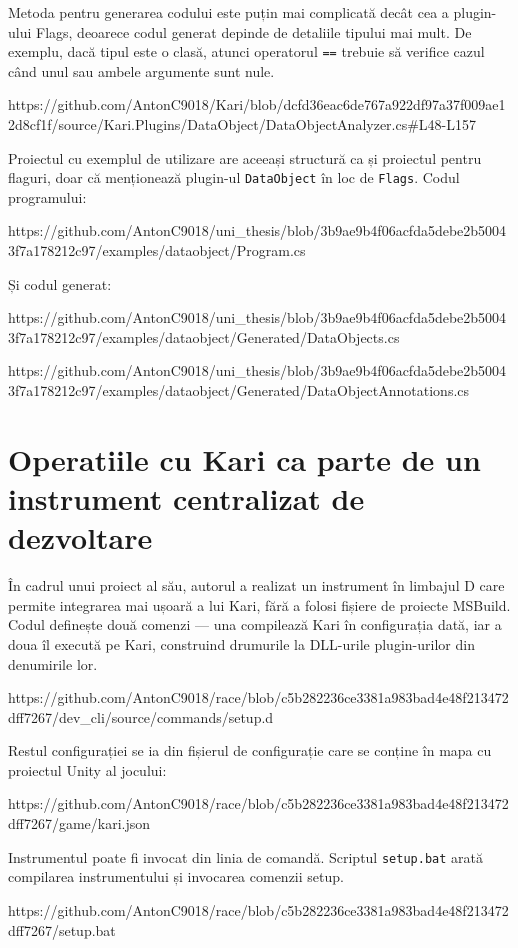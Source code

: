 \documentclass{report}
\begin{document}
Metoda pentru generarea codului este puțin mai complicată decât cea a plugin-ului Flags, deoarece codul generat depinde de detaliile tipului mai mult.
De exemplu, dacă tipul este o clasă, atunci operatorul \texttt{==} trebuie să verifice cazul când unul sau ambele argumente sunt nule. 

https://github.com/AntonC9018/Kari/blob/dcfd36eac6de767a922df97a37f009ae12d8cf1f/source/Kari.Plugins/DataObject/DataObjectAnalyzer.cs#L48-L157

Proiectul cu exemplul de utilizare are aceeași structură ca și proiectul pentru flaguri, doar că menționează plugin-ul \texttt{DataObject} în loc de \texttt{Flags}.
Codul programului:

https://github.com/AntonC9018/uni_thesis/blob/3b9ae9b4f06acfda5debe2b50043f7a178212c97/examples/dataobject/Program.cs

Și codul generat:

https://github.com/AntonC9018/uni_thesis/blob/3b9ae9b4f06acfda5debe2b50043f7a178212c97/examples/dataobject/Generated/DataObjects.cs

https://github.com/AntonC9018/uni_thesis/blob/3b9ae9b4f06acfda5debe2b50043f7a178212c97/examples/dataobject/Generated/DataObjectAnnotations.cs

\section{Operatiile cu Kari ca parte de un instrument centralizat de dezvoltare}

În cadrul unui proiect al său, autorul a realizat un instrument în limbajul D care permite integrarea mai ușoară a lui Kari, fără a folosi fișiere de proiecte MSBuild.
Codul definește două comenzi — una compilează Kari în configurația dată, iar a doua îl execută pe Kari, construind drumurile la DLL-urile plugin-urilor din denumirile lor.

https://github.com/AntonC9018/race/blob/c5b282236ce3381a983bad4e48f213472dff7267/dev_cli/source/commands/setup.d

Restul configurației se ia din fișierul de configurație care se conține în mapa cu proiectul Unity al jocului:

https://github.com/AntonC9018/race/blob/c5b282236ce3381a983bad4e48f213472dff7267/game/kari.json

Instrumentul poate fi invocat din linia de comandă.
Scriptul \texttt{setup.bat} arată compilarea instrumentului și invocarea comenzii setup.

https://github.com/AntonC9018/race/blob/c5b282236ce3381a983bad4e48f213472dff7267/setup.bat
\end{document}
